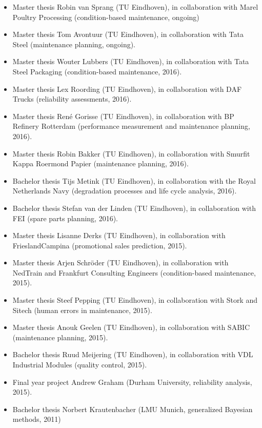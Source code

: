 \documentclass[a4paper]{simplecv}
\begin{document}
\begin{itemize}
\item Master thesis Robin van Sprang (TU Eindhoven),
in collaboration with Marel Poultry Processing (condition-based maintenance, ongoing)
\item Master thesis Tom Avontuur (TU Eindhoven),
in collaboration with Tata Steel (maintenance planning, ongoing).
\item Master thesis Wouter Lubbers (TU Eindhoven),
in collaboration with Tata Steel Packaging (condition-based maintenance, 2016).
\item Master thesis Lex Roording (TU Eindhoven),
in collaboration with DAF Trucks (reliability assessments, 2016).
\item Master thesis Ren\'{e} Gorisse (TU Eindhoven),
in collaboration with BP Refinery Rotterdam (performance measurement and maintenance planning, 2016).
\item Master thesis Robin Bakker (TU Eindhoven),
in collaboration with Smurfit Kappa Roermond Papier (maintenance planning, 2016).
\item Bachelor thesis Tijs Metink (TU Eindhoven),
in collaboration with the Royal Netherlands Navy (degradation processes and life cycle analysis, 2016).
\item Bachelor thesis Stefan van der Linden (TU Eindhoven),
in collaboration with FEI (spare parts planning, 2016).
\item Master thesis Lisanne Derks (TU Eindhoven),
in collaboration with FrieslandCampina (promotional sales prediction, 2015).
\item Master thesis Arjen Schr\"{o}der (TU Eindhoven),
in collaboration with NedTrain and Frankfurt Consulting Engineers (condition-based maintenance, 2015).
\item Master thesis Steef Pepping (TU Eindhoven),
in collaboration with Stork and Sitech (human errors in maintenance, 2015).
\item Master thesis Anouk Geelen (TU Eindhoven),
in collaboration with SABIC (maintenance planning, 2015).
\item Bachelor thesis Ruud Meijering (TU Eindhoven),
in collaboration with VDL Industrial Modules (quality control, 2015).
\item Final year project Andrew Graham (Durham University, reliability analysis, 2015).
\item Bachelor thesis Norbert Krautenbacher (LMU Munich, generalized Bayesian methods, 2011)
\end{itemize}
\end{document}
